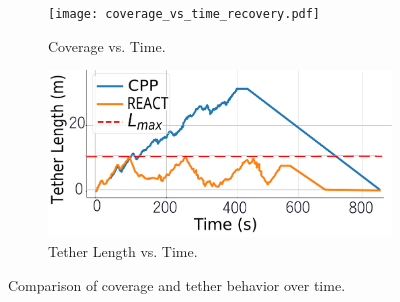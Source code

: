 \begin{figure}[t]
    \centering
    \begin{subfigure}[b]{0.48\linewidth}
        \centering
        \texttt{[image: coverage\_vs\_time\_recovery.pdf]}
        \caption{ Coverage vs. Time.}
        \label{fig:coverage_vs_time}
    \end{subfigure}
    \hfill
    \begin{subfigure}[b]{0.48\linewidth}
        \centering
        \includegraphics[width=\linewidth]{EA-Planner/figures/tether_length_vs_time_with_recovery.pdf}
        \caption{Tether Length vs. Time.}
        \label{fig:tether_vs_time}
    \end{subfigure}
    \caption{Comparison of coverage and tether behavior over time.}
    \label{fig:coverage_tether_sidebyside}
\end{figure}


